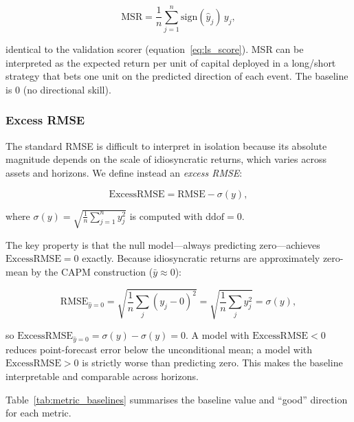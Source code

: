 \documentclass{article}
\begin{document}
\begin{equation}
\mathrm{MSR} = \frac{1}{n}\sum_{j=1}^{n} \mathrm{sign}(\hat{y}_j)\,y_j,
\end{equation}

identical to the validation scorer (equation~\ref{eq:ls_score}). MSR can be interpreted as the expected return per unit of capital deployed in a long/short strategy that bets one unit on the predicted direction of each event. The baseline is 0 (no directional skill).

\subsubsection{Excess RMSE}

The standard RMSE is difficult to interpret in isolation because its absolute magnitude depends on the scale of idiosyncratic returns, which varies across assets and horizons. We define instead an \textit{excess RMSE}:

\begin{equation}
\mathrm{ExcessRMSE} = \mathrm{RMSE} - \sigma(y),
\end{equation}

where $\sigma(y) = \sqrt{\frac{1}{n}\sum_{j=1}^{n} y_j^2}$ is computed with $\mathrm{ddof}=0$.

The key property is that the null model---always predicting zero---achieves $\mathrm{ExcessRMSE} = 0$ exactly. Because idiosyncratic returns are approximately zero-mean by the CAPM construction ($\bar{y} \approx 0$):

\begin{equation}
\mathrm{RMSE}_{\hat{y}=0}
= \sqrt{\frac{1}{n}\sum_{j} (y_j - 0)^2}
= \sqrt{\frac{1}{n}\sum_{j} y_j^2}
= \sigma(y),
\end{equation}

so $\mathrm{ExcessRMSE}_{\hat{y}=0} = \sigma(y) - \sigma(y) = 0$. A model with $\mathrm{ExcessRMSE} < 0$ reduces point-forecast error below the unconditional mean; a model with $\mathrm{ExcessRMSE} > 0$ is strictly worse than predicting zero. This makes the baseline interpretable and comparable across horizons.

Table~\ref{tab:metric_baselines} summarises the baseline value and ``good'' direction for each metric.
\end{document}
